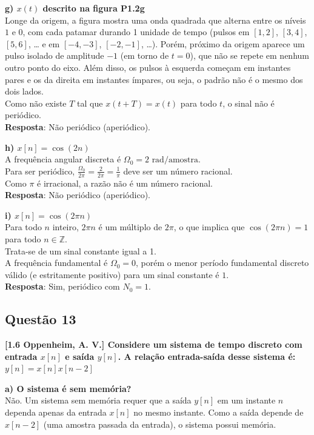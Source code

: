 \textbf{g) \(x(t)\) descrito na figura P1.2g}\\
Longe da origem, a figura mostra uma onda quadrada que alterna entre os níveis \(1\) e \(0\), com cada patamar durando 1 unidade de tempo (pulsos em \([1,2]\), \([3,4]\), \([5,6]\), \ldots{} e em \([-4,-3]\), \([-2,-1]\), \ldots). Porém, próximo da origem aparece um pulso isolado de amplitude \(-1\) (em torno de \(t = 0\)), que não se repete em nenhum outro ponto do eixo. Além disso, os pulsos à esquerda começam em instantes pares e os da direita em instantes ímpares, ou seja, o padrão não é o mesmo dos dois lados.\\
Como não existe \(T\) tal que \(x(t + T) = x(t)\) para todo \(t\), o sinal não é periódico.\\
\textbf{Resposta}: Não periódico (aperiódico).

\textbf{h) \(x[n] = \cos(2n)\)}\\
A frequência angular discreta é \(\Omega_0 = 2 \text{ rad/amostra}\).\\
Para ser periódico, \(\frac{\Omega_0}{2\pi} = \frac{2}{2\pi} = \frac{1}{\pi}\) deve ser um número racional.\\
Como \(\pi\) é irracional, a razão não é um número racional.\\
\textbf{Resposta}: Não periódico (aperiódico).

\textbf{i) \(x[n] = \cos(2\pi n)\)}\\
Para todo \(n\) inteiro, \(2\pi n\) é um múltiplo de \(2\pi\), o que implica que \(\cos(2\pi n) = 1\) para todo \(n \in \mathbb{Z}\).\\
Trata-se de um sinal constante igual a 1.\\
A frequência fundamental é \(\Omega_0 = 0\), porém o menor período fundamental discreto válido (e estritamente positivo) para um sinal constante é \(1\).\\
\textbf{Resposta}: Sim, periódico com \(N_0 = 1\).

\subsection{Questão 13}\label{questuxe3o-13}

\textbf{{[}1.6 Oppenheim, A. V.{]} Considere um sistema de tempo discreto com entrada \(x[n]\) e saída \(y[n]\). A relação entrada-saída desse sistema é: \(y[n] = x[n]x[n - 2]\)}

\textbf{a) O sistema é sem memória?}\\
Não. Um sistema sem memória requer que a saída \(y[n]\) em um instante \(n\) dependa apenas da entrada \(x[n]\) no mesmo instante. Como a saída depende de \(x[n-2]\) (uma amostra passada da entrada), o sistema possui memória.

